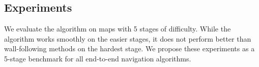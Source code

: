 \subsection{Experiments}
\label{sec:navtasks}
We evaluate the \NavAiiiCDiDiiL{} algorithm on maps with 5 stages of difficulty. While the algorithm works smoothly on the easier stages, it does not perform better than wall-following  methods on the hardest stage.
We propose these experiments as a 5-stage benchmark for all end-to-end navigation algorithms.


